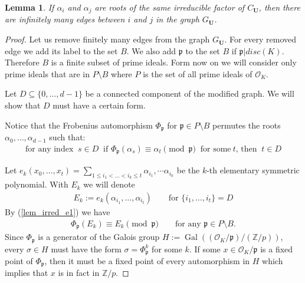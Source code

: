 \documentclass[preprint,12pt]{elsarticle}
\newcommand{\Z}{\mathbb{Z}}
\newcommand{\OO}{\mathcal{O}}
\newcommand{\alphas}{\alpha_0,\ldots,\alpha_{d-1}}
\newcommand{\pp}{\mathfrak{p} }
\DeclareMathOperator{\gal}{Gal}
\newtheorem{lemma}{Lemma}
\begin{document}
\begin{lemma}\label{lem_irred}
    If $\alpha_i$ and $\alpha_j$ are roots of the same irreducible factor of $C_{\mathbf U}$, then there are infinitely many edges between $i$ and $j$ in the graph $G_\mathbf{U}$.
\end{lemma}
\begin{proof}
    

    Let us remove finitely many edges from the graph $G_
    \mathbf{U}$.
    For every removed edge we add its label to the set $B$. We also add $\pp$ to the set $B$ if $\pp|disc(K)$. Therefore $B$ is a finite subset of prime ideals. Form now on we will consider only prime ideals that are in $P\setminus B$ where $P$ is the set of all prime ideals of $\OO_K$. 
    
    Let $D\subseteq \{0,\ldots,d-1\}$ be a connected component of the modified graph. We will show that $D$ must have a certain form.
    
    Notice that the Frobenius automorphism $\Phi_\pp$ for $\pp\in P\setminus B$ permutes the roots $\alphas$ such that:
    \begin{align}\label{lem_irred_e1}
        \text{for any index } \ s\in D\ \text{ if } \Phi_\pp(\alpha_s) \equiv \alpha_t \pmod \pp \ \text{ for some}\ t \text{, then } \ t\in D
    \end{align} 
    

    Let $e_k(x_0,\ldots,x_t)=\sum_{1\leq i_1<\ldots <i_k\leq t}\alpha_{i_1},\cdots \alpha_{i_k}$ be the $k$-th elementary symmetric polynomial. 
    With $E_k$ we will denote
    \begin{align}\label{e_k_def}
        E_k := e_k(\alpha_{i_1}, \ldots, \alpha_{i_t}) \qquad\text{for $\{i_1,\ldots,i_t\}=D$}
    \end{align}
    By (\ref{lem_irred_e1}) we have
    \begin{align} \label{lem_irred_Eq_fix}
        \Phi_\pp(E_k) \equiv E_k \pmod \pp \qquad\text{for any $\pp\in P\setminus B$}.
    \end{align}
    Since $\Phi_\pp$ is a generator of the Galois group $H:=\gal\left((\OO_K/\pp)/ (\Z/p)\right)$, every $\sigma\in H$ must have the form $\sigma=\Phi_\pp^k$ for some $k$. If some $x\in \OO_K/\pp$ is a fixed point of $\Phi_\pp$, then it must be a fixed point of every automorphism in $H$ which implies that $x$ is in fact in $\Z/p$.  


\end{proof}
\end{document}
